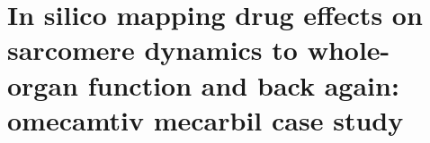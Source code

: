 \chapter{In silico mapping drug effects on sarcomere dynamics to whole-organ 
function and back again: omecamtiv mecarbil case study}\label{cha:chapter5}
%
%
%


